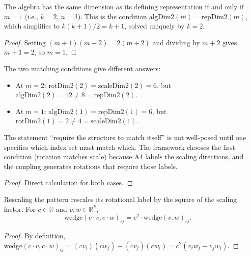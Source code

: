 \begin{theorem}
The algebra has the same dimension as its defining representation if and only if $m = 1$
(i.e., $k = 2$, $n = 3$). This is the condition $\text{algDim2}(m) = \text{repDim2}(m)$,
which simplifies to $k(k+1)/2 = k + 1$, solved uniquely by $k = 2$.
\end{theorem}
\begin{proof}
Setting $(m+1)(m+2) = 2(m+2)$ and dividing by $m+2$ gives $m+1 = 2$, so $m = 1$.
\end{proof}

\begin{theorem}
The two matching conditions give different answers:
\begin{itemize}
  \item At $m = 2$: $\text{rotDim2}(2) = \text{scaleDim2}(2) = 6$, but $\text{algDim2}(2) = 12 \neq 8 = \text{repDim2}(2)$.
  \item At $m = 1$: $\text{algDim2}(1) = \text{repDim2}(1) = 6$, but $\text{rotDim2}(1) = 2 \neq 4 = \text{scaleDim2}(1)$.
\end{itemize}
The statement ``require the structure to match itself'' is not well-posed until one specifies
which index set must match which. The framework chooses the first condition (rotation matches scale)
because A4 labels the scaling directions, and the coupling generates rotations that require those labels.
\end{theorem}
\begin{proof}
Direct calculation for both cases.
\end{proof}

\begin{theorem}
Rescaling the pattern rescales its rotational label by the square of the scaling factor.
For $c \in \mathbb{R}$ and $v, w \in \mathbb{R}^k$,
\[\text{wedge}(c \cdot v, c \cdot w)_{ij} = c^2 \cdot \text{wedge}(v, w)_{ij}.\]
\end{theorem}
\begin{proof}
By definition, $\text{wedge}(c \cdot v, c \cdot w)_{ij} = (cv_i)(cw_j) - (cv_j)(cw_i) = c^2(v_i w_j - v_j w_i)$.
\end{proof}

